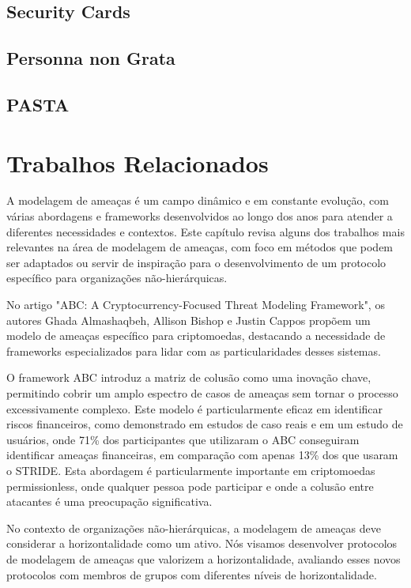 \subsection{Security Cards}
\label{sec:Security Cards}

\subsection{Personna non Grata}
\label{sec:Personna}

\subsection{PASTA}
\label{sec:PASTA}



\section{Trabalhos Relacionados}
\label{sec:related}

A modelagem de ameaças é um campo dinâmico e em constante evolução, com várias
abordagens e frameworks desenvolvidos ao longo dos anos para atender a diferentes
necessidades e contextos. Este capítulo revisa alguns dos trabalhos mais relevantes na área
de modelagem de ameaças, com foco em métodos que podem ser adaptados ou servir de
inspiração para o desenvolvimento de um protocolo específico para organizações
não-hierárquicas. 

No artigo "ABC: A Cryptocurrency-Focused Threat Modeling Framework", os autores
Ghada Almashaqbeh, Allison Bishop e Justin Cappos propõem um modelo de ameaças
específico para criptomoedas, destacando a necessidade de frameworks especializados
para lidar com as particularidades desses sistemas. 

O framework ABC introduz a matriz de colusão como uma inovação chave,
permitindo cobrir um amplo espectro de casos de ameaças sem tornar o processo
excessivamente complexo. Este modelo é particularmente eficaz em identificar riscos
financeiros, como demonstrado em estudos de caso reais e em um estudo de usuários, onde
71\% dos participantes que utilizaram o ABC conseguiram identificar ameaças
financeiras, em comparação com apenas 13\% dos que usaram o STRIDE. Esta abordagem é
particularmente importante em criptomoedas permissionless, onde qualquer pessoa pode
participar e onde a colusão entre atacantes é uma preocupação significativa. 

No contexto de organizações não-hierárquicas, a modelagem de ameaças deve considerar
a horizontalidade como um ativo. Nós visamos desenvolver protocolos de modelagem de ameaças que
valorizem a horizontalidade, avaliando esses novos protocolos com membros de grupos
com diferentes níveis de horizontalidade. 

